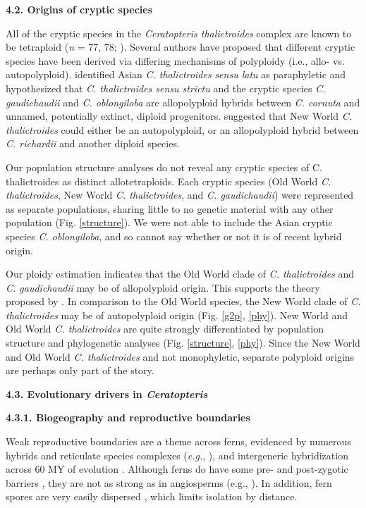 \documentclass[12pt]{article}
\begin{document}
\begin{flushleft}
\textbf{4.2. Origins of cryptic species}

All of the cryptic species in the \textit{Ceratopteris thalictroides} complex are known to be tetraploid (\textit{n} = 77, 78; \cite{Masuyama2010}). Several authors have proposed that different cryptic species have been derived via differing mechanisms of polyploidy (i.e., allo- vs. autopolyploid). \textcite{Adjie2007} identified Asian \textit{C. thalictroides} \textit{sensu latu} as paraphyletic and hypothesized that \textit{C. thalictroides sensu strictu} and the cryptic species \textit{C. gaudichaudii} and \textit{C. oblongiloba} are allopolyploid hybrids between \textit{C. cornuta} and unnamed, potentially extinct, diploid progenitors. \textcite{McGrath1994} suggested that New World \textit{C. thalictroides} could either be an autopolyploid, or an allopolyploid hybrid between \textit{C. richardii} and another diploid species.

Our population structure analyses do not reveal any cryptic species of C. thalictroides as distinct allotetraploids. Each cryptic species (Old World \textit{C. thalictroides}, New World \textit{C. thalictroides}, and \textit{C. gaudichaudii}) were represented as separate populations, sharing little to no genetic material with any other population (Fig. \ref{structure}). We were not able to include the Asian cryptic species \textit{C. oblongiloba}, and so cannot say whether or not it is of recent hybrid origin. 

Our ploidy estimation indicates that the Old World clade of \textit{C. thalictroides} and \textit{C. gaudichaudii} may be of allopolyploid origin. This supports the theory proposed by \textcite{Adjie2007}. In comparison to the Old World species, the New World clade of \textit{C. thalictroides} may be of autopolyploid origin (Fig. \ref{g2p}, \ref{phy}). New World and Old World \textit{C. thalictroides} are quite strongly differentiated by population structure and phylogenetic analyses (Fig. \ref{structure}, \ref{phy}). Since the New World and Old World \textit{C. thalictroides} and not monophyletic, separate polyploid origins are perhaps only part of the story.


{\textbf{4.3. Evolutionary drivers in \textit{Ceratopteris}}}

\textbf{4.3.1. Biogeography and reproductive boundaries}

Weak reproductive boundaries are a theme across ferns, evidenced by numerous hybrids and reticulate species complexes (\emph{e.g.}, \cite{Barrington1989,  Paris1989, Sessa2012a, Sigel2016, Yatabe2009}), and intergeneric hybridization across 60 MY of evolution \autocite{Rothfels2015}. Although ferns do have some pre- and post-zygotic barriers \autocite{Haufler2016}, they are not as strong as in angiosperms (e.g., \cite{De_Nettancourt1997, Lafon-Placette2016}). In addition, fern spores are very easily dispersed \autocite{Tryon1970, Smith1972}, which limits isolation by distance. 


\end{flushleft}
\end{document}
